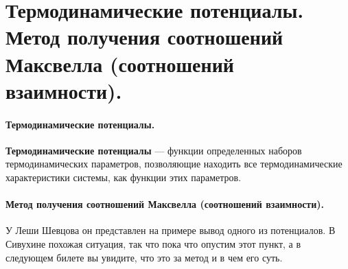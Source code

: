 \section{\normalsize  Термодинамические потенциалы. Метод получения соотношений Максвелла (соотношений взаимности). }
\paragraph{Термодинамические потенциалы.} \textbf{Термодинамические потенциалы} --- функции определенных наборов термодинамических параметров, позволяющие находить все термодинамические характеристики системы, как функции этих параметров.
\paragraph{Метод получения соотношений Максвелла (соотношений взаимности).} У Леши Шевцова он представлен на примере вывод одного из потенциалов. В Сивухине похожая ситуация, так что пока что опустим этот пункт, а в следующем билете вы увидите, что это за метод и в чем его суть.
